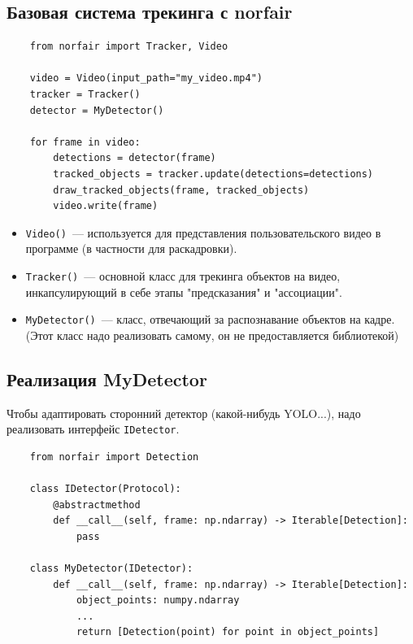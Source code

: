 \subsection{Базовая система трекинга с norfair}

\scriptsize
\begin{verbatim}
    from norfair import Tracker, Video

    video = Video(input_path="my_video.mp4")
    tracker = Tracker()
    detector = MyDetector()
    
    for frame in video:
        detections = detector(frame)
        tracked_objects = tracker.update(detections=detections)
        draw_tracked_objects(frame, tracked_objects)
        video.write(frame)
    \end{verbatim}

\begin{itemize}
    \item \texttt{Video()}~--- используется для представления пользовательского видео в программе (в частности для раскадровки).
    \item \texttt{Tracker()}~--- основной класс для трекинга объектов на видео, инкапсулирующий в себе этапы "предсказания" и "ассоциации".
    \item \texttt{MyDetector()}~--- класс, отвечающий за распознавание объектов на кадре. (Этот класс надо реализовать самому, он не предоставляется библиотекой)
\end{itemize}

\subsection{Реализация MyDetector}

Чтобы адаптировать сторонний детектор (какой-нибудь YOLO...), надо реализовать интерфейс \texttt{IDetector}.

\scriptsize
\begin{verbatim}
    from norfair import Detection

    сlass IDetector(Protocol):
        @abstractmethod
        def __call__(self, frame: np.ndarray) -> Iterable[Detection]:
            pass

    class MyDetector(IDetector):
        def __call__(self, frame: np.ndarray) -> Iterable[Detection]:
            object_points: numpy.ndarray
            ...
            return [Detection(point) for point in object_points]
    \end{verbatim}


